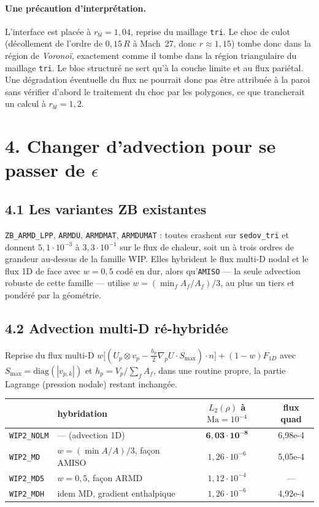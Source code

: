 \documentclass[11pt,a4paper]{article}
\begin{document}
\paragraph{Une précaution d'interprétation.} L'interface est placée à
$r_{bl}=1{,}04$, reprise du maillage \texttt{tri}. Le choc de culot (décollement
de l'ordre de $0{,}15\,R$ à Mach~27, donc $r\approx1{,}15$) tombe donc dans la
région de \emph{Voronoï}, exactement comme il tombe dans la région triangulaire
du maillage \texttt{tri}. Le bloc structuré ne sert qu'à la couche limite et au
flux pariétal. Une dégradation éventuelle du flux ne pourrait donc pas être
attribuée à la paroi sans vérifier d'abord le traitement du choc par les
polygones, ce que trancherait un calcul à $r_{bl}=1{,}2$.

\section*{4. Changer d'advection pour se passer de $\epsilon$}

\subsection*{4.1 Les variantes ZB existantes}

\texttt{ZB\_ARMD\_LPP}, \texttt{ARMDU}, \texttt{ARMDMAT}, \texttt{ARMDUMAT} :
toutes crashent sur \texttt{sedov\_tri} et donnent $5{,}1\cdot10^{-3}$ à
$3{,}3\cdot10^{-1}$ sur le flux de chaleur, soit un à trois ordres de grandeur
au-dessus de la famille WIP. Elles hybrident le flux multi-D nodal et le flux 1D de
face avec $w = 0{,}5$ codé en dur, alors qu'\texttt{AMISO} --- la seule advection
robuste de cette famille --- utilise $w = (\min_f A_f/A_f)/3$, au plus un tiers et
pondéré par la géométrie.

\subsection*{4.2 Advection multi-D ré-hybridée}

Reprise du flux multi-D
$w\big[(U_p\otimes v_p - \tfrac{h_p}{2}\nabla_p U\cdot S_{\max})\cdot n\big] + (1-w)F_{1D}$
avec $S_{\max}=\mathrm{diag}(|v_{p,k}|)$ et $h_p = V_p/\sum_f A_f$, dans une routine
propre, la partie Lagrange (pression nodale) restant inchangée.

\begin{table}[h]\centering
\begin{tabular}{llcc}
\toprule
& hybridation & $L_2(\rho)$ à $\mathrm{Ma}=10^{-4}$ & flux quad \\
\midrule
\texttt{WIP2\_NOLM} & --- (advection 1D) & $\mathbf{6{,}03\cdot10^{-8}}$ & 6{,}98e-4 \\
\texttt{WIP2\_MD}   & $w=(\min A/A)/3$, façon AMISO & $1{,}26\cdot10^{-6}$ & 5{,}05e-4 \\
\texttt{WIP2\_MD5}  & $w=0{,}5$, façon ARMD & $1{,}12\cdot10^{-4}$ & --- \\
\texttt{WIP2\_MDH}  & idem MD, gradient enthalpique & $1{,}26\cdot10^{-6}$ & 4{,}92e-4 \\
\bottomrule
\end{tabular}
\end{table}
\end{document}
